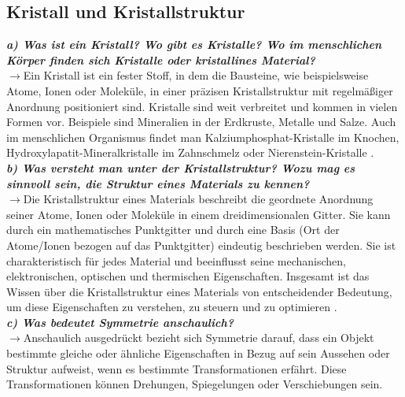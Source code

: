 \subsection{\label{subsec:FZV4}Kristall und Kristallstruktur}
\textbf{\textit{a) Was ist ein Kristall? Wo gibt es Kristalle? Wo im menschlichen Körper
finden sich Kristalle oder kristallines Material?}}\\
$\rightarrow$Ein Kristall ist ein fester Stoff, in dem die Bausteine, wie beispielsweise Atome, Ionen oder Moleküle, 
in einer präzisen Kristallstruktur mit regelmäßiger Anordnung positioniert sind. Kristalle sind weit verbreitet 
und kommen in vielen Formen vor. Beispiele sind Mineralien in der Erdkruste, Metalle und Salze. 
Auch im menschlichen Organismus findet man Kalziumphosphat-Kristalle im Knochen, 
Hydroxylapatit-Mineralkristalle im Zahnschmelz
oder Nierenstein-Kristalle \cite{EPC}. \\  

\textbf{\textit{b) Was versteht man unter der Kristallstruktur? Wozu mag es sinnvoll sein,
die Struktur eines Materials zu kennen?}}\\
$\rightarrow$Die Kristallstruktur eines Materials beschreibt die geordnete Anordnung seiner Atome, 
Ionen oder Moleküle in einem dreidimensionalen Gitter. Sie kann durch ein mathematisches Punktgitter und
durch eine Basis (Ort der Atome/Ionen bezogen auf das Punktgitter) eindeutig beschrieben werden.
Sie ist charakteristisch für jedes Material und beeinflusst seine mechanischen, elektronischen, 
optischen und thermischen Eigenschaften. Insgesamt ist das Wissen über die Kristallstruktur eines Materials 
von entscheidender Bedeutung, um diese Eigenschaften zu verstehen, zu steuern und zu optimieren \cite{EPC}. \\

\textbf{\textit{c) Was bedeutet Symmetrie anschaulich?}}\\
$\rightarrow$Anschaulich ausgedrückt bezieht sich Symmetrie darauf, dass ein Objekt 
bestimmte gleiche oder ähnliche Eigenschaften in Bezug auf sein Aussehen oder Struktur aufweist, 
wenn es bestimmte Transformationen erfährt. 
Diese Transformationen können Drehungen, Spiegelungen oder Verschiebungen sein.\\

